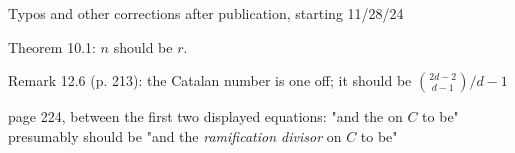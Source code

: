 Typos and other corrections after publication, starting 11/28/24

Theorem 10.1: $n$ should be $r$.

Remark 12.6 (p. 213): the Catalan number is one off; it should be $\binom{2d-2}{d-1}/d-1$

page 224, between the first two displayed equations: "and the on $C$ to be" presumably should be "and the \emph{ramification divisor} on $C$ to be"